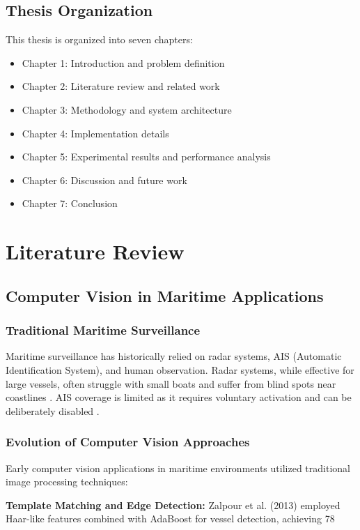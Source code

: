 \documentclass[a4paper,11pt]{article}
\begin{document}
\subsection{Thesis Organization}
This thesis is organized into seven chapters:
\begin{itemize}
    \item Chapter 1: Introduction and problem definition
    \item Chapter 2: Literature review and related work
    \item Chapter 3: Methodology and system architecture
    \item Chapter 4: Implementation details
    \item Chapter 5: Experimental results and performance analysis
    \item Chapter 6: Discussion and future work
    \item Chapter 7: Conclusion
\end{itemize}

\section{Literature Review}

\subsection{Computer Vision in Maritime Applications}

\subsubsection{Traditional Maritime Surveillance}
Maritime surveillance has historically relied on radar systems, AIS (Automatic Identification System), and human observation. Radar systems, while effective for large vessels, often struggle with small boats and suffer from blind spots near coastlines \cite{greidanus2006detection}. AIS coverage is limited as it requires voluntary activation and can be deliberately disabled \cite{iphar2020data}.

\subsubsection{Evolution of Computer Vision Approaches}
Early computer vision applications in maritime environments utilized traditional image processing techniques:

\textbf{Template Matching and Edge Detection:} Zalpour et al. (2013) \cite{zalpour2013vessel} employed Haar-like features combined with AdaBoost for vessel detection, achieving 78%
\end{document}
